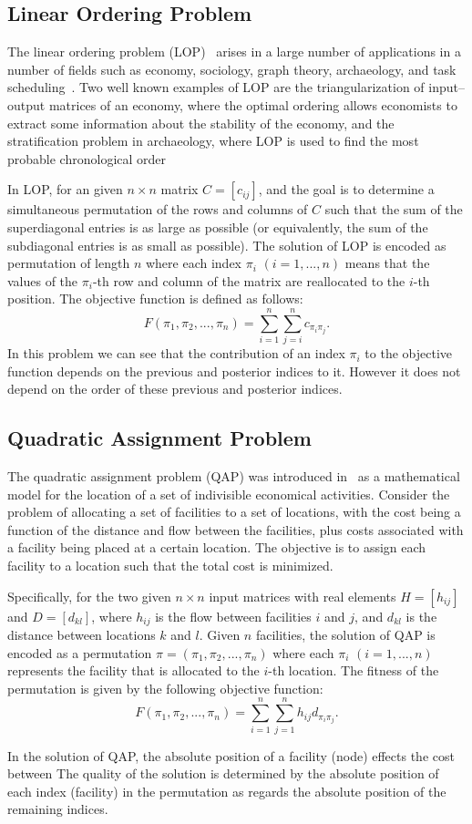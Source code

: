 \subsection{Linear Ordering Problem}
The linear ordering problem (LOP)~\citep{marti2011linear} arises in a large number of applications in a number of fields such as economy, sociology, graph theory, archaeology, and task scheduling~\citep{schiavinotto2004linear}. Two well known examples of LOP are the triangularization of input–output matrices of an economy, where the optimal ordering allows economists to extract some information about the stability of the economy, and the stratification problem in archaeology, where LOP is used to find the most probable chronological order

In LOP, for an given $n\times n$ matrix $C=[c_{ij}]$, and the goal is to determine a simultaneous permutation of the rows and columns of $C$ such that the sum of the superdiagonal entries is as large as possible (or equivalently, the sum of the subdiagonal entries is as small as possible). The solution of LOP is encoded as permutation of length $n$ where each index $\pi_i$ $(i=1,...,n)$ means that the values of the $\pi_i$-th row and column of the matrix are reallocated to the $i$-th position. The objective function is defined as follows:
\begin{equation*}
	F(\pi_1, \pi_2, ... , \pi_n) = \sum^{n}_{i=1}\sum^{n}_{j=i}{ c_{\pi_i\pi_j} } \text{.}
\end{equation*}
In this problem we can see that the contribution of an index $\pi_i$ to the objective function depends on the previous and posterior indices to it. However it does not depend on the order of these previous and posterior indices.


\subsection{Quadratic Assignment Problem}
The quadratic assignment problem (QAP) was introduced in~\citep{koopmans1957assignment} as a mathematical model for the location of a set of indivisible economical activities. Consider the problem of allocating a set of facilities to a set of locations, with the cost being a function of the distance and flow between the facilities, plus costs associated with a facility being placed at a certain location. The objective is to assign each facility to a location such that the total cost is minimized.

Specifically, for the two given $n\times n$ input matrices with real elements $H=[h_{ij}]$ and $D=[d_{kl}]$, where $h_{ij}$ is the flow between facilities $i$ and $j$, and $d_{kl}$ is the distance between locations $k$ and $l$. Given $n$ facilities, the solution of QAP is encoded as a permutation $\pi = (\pi_1, \pi_2,...,\pi_n)$ where each $\pi_i$ $(i =1,...,n)$ represents the facility that is allocated to the $i$-th location. The fitness of the permutation is given by the following objective function:
\begin{equation*}
	F(\pi_1, \pi_2, ... , \pi_n) = \sum^{n}_{i=1}\sum^{n}_{j=1}{ h_{ij}d_{\pi_i\pi_j} } \text{.}
\end{equation*}

In the solution of QAP, the absolute position of a facility (node) effects the cost between 
The quality of the solution is determined by the absolute position of each index (facility) in the permutation as regards the absolute position of the remaining indices.


